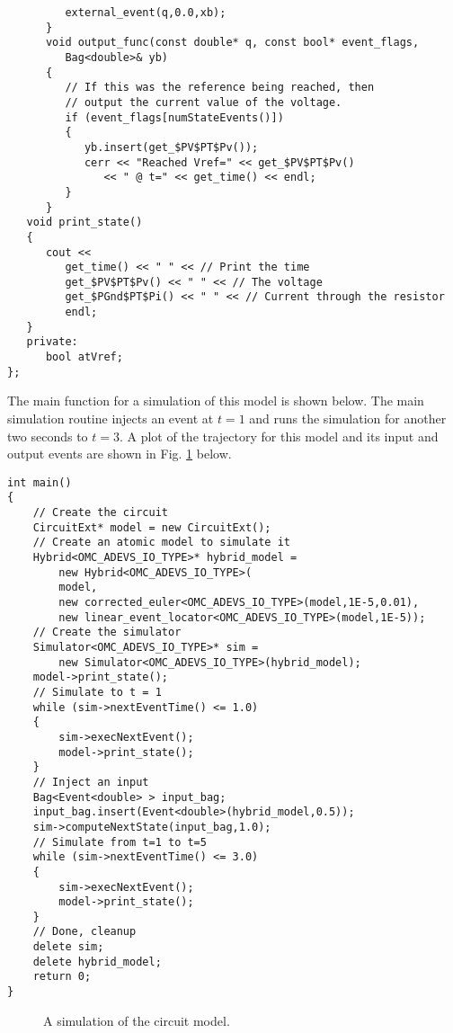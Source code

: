 \begin{verbatim}
         external_event(q,0.0,xb);
      }
      void output_func(const double* q, const bool* event_flags,
         Bag<double>& yb)
      {
         // If this was the reference being reached, then
         // output the current value of the voltage.
         if (event_flags[numStateEvents()])
         {
            yb.insert(get_$PV$PT$Pv());
            cerr << "Reached Vref=" << get_$PV$PT$Pv()
               << " @ t=" << get_time() << endl;
         }
      }
   void print_state()
   {
      cout <<
         get_time() << " " << // Print the time
         get_$PV$PT$Pv() << " " << // The voltage
         get_$PGnd$PT$Pi() << " " << // Current through the resistor
         endl;
   }
   private:
      bool atVref;
};
\end{verbatim}

The main function for a simulation of this model is shown below. The main simulation routine injects an event at $t=1$ and runs the simulation for another two seconds to $t=3$. A plot of the trajectory for this model and its input and output events are shown in Fig. \ref{fig:circuit} below.
\begin{verbatim}
int main()
{
    // Create the circuit
    CircuitExt* model = new CircuitExt();
    // Create an atomic model to simulate it
    Hybrid<OMC_ADEVS_IO_TYPE>* hybrid_model =
        new Hybrid<OMC_ADEVS_IO_TYPE>(
        model,
        new corrected_euler<OMC_ADEVS_IO_TYPE>(model,1E-5,0.01),
        new linear_event_locator<OMC_ADEVS_IO_TYPE>(model,1E-5));
    // Create the simulator
    Simulator<OMC_ADEVS_IO_TYPE>* sim =
        new Simulator<OMC_ADEVS_IO_TYPE>(hybrid_model);
    model->print_state();
    // Simulate to t = 1
    while (sim->nextEventTime() <= 1.0)
    {
        sim->execNextEvent();
        model->print_state();
    }
    // Inject an input
    Bag<Event<double> > input_bag;
    input_bag.insert(Event<double>(hybrid_model,0.5));
    sim->computeNextState(input_bag,1.0);
    // Simulate from t=1 to t=5
    while (sim->nextEventTime() <= 3.0)
    {
        sim->execNextEvent();
        model->print_state();
    }
    // Done, cleanup
    delete sim;
    delete hybrid_model;
    return 0;
}
\end{verbatim}

\begin{figure}[ht]
\centering
{}
\caption{A simulation of the circuit model.}
\label{fig:circuit}
\end{figure}
